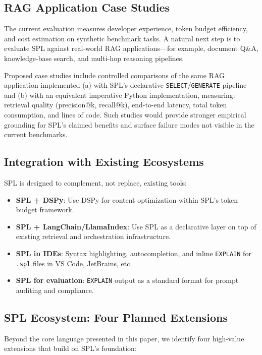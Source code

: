 \documentclass[11pt,a4paper]{article}
\begin{document}
\subsection{RAG Application Case Studies}

The current evaluation measures developer experience, token budget efficiency, and
cost estimation on synthetic benchmark tasks. A natural next step is to evaluate SPL
against real-world RAG applications---for example, document Q\&A, knowledge-base
search, and multi-hop reasoning pipelines.

Proposed case studies include controlled comparisons of the same RAG application
implemented (a) with SPL's declarative \texttt{SELECT}/\texttt{GENERATE} pipeline
and (b) with an equivalent imperative Python implementation, measuring:
retrieval quality (precision@k, recall@k), end-to-end latency, total token consumption,
and lines of code. Such studies would provide stronger empirical grounding for SPL's
claimed benefits and surface failure modes not visible in the current benchmarks.

\subsection{Integration with Existing Ecosystems}

SPL is designed to complement, not replace, existing tools:

\begin{itemize}[nosep]
  \item \textbf{SPL + DSPy}: Use DSPy for content optimization within SPL's token budget framework.
  \item \textbf{SPL + LangChain/LlamaIndex}: Use SPL as a declarative layer on top of existing retrieval and orchestration infrastructure.
  \item \textbf{SPL in IDEs}: Syntax highlighting, autocompletion, and inline \texttt{EXPLAIN} for \texttt{.spl} files in VS Code, JetBrains, etc.
  \item \textbf{SPL for evaluation}: \texttt{EXPLAIN} output as a standard format for prompt auditing and compliance.
\end{itemize}

\subsection{SPL Ecosystem: Four Planned Extensions}

Beyond the core language presented in this paper, we identify four high-value
extensions that build on SPL's foundation:
\end{document}
